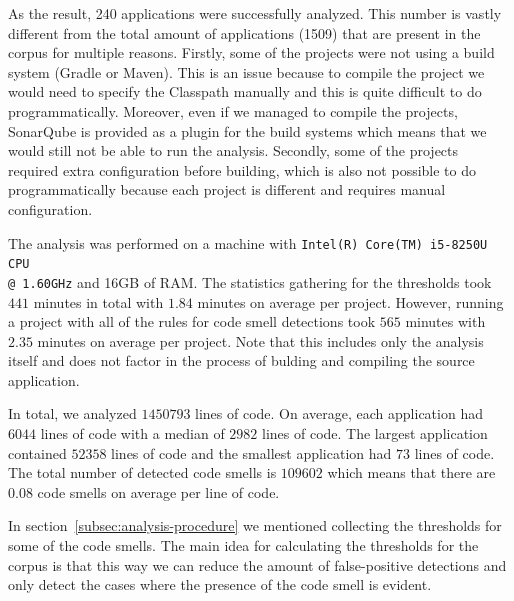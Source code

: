 

As the result, 240 applications were successfully analyzed.
This number is vastly different from the total amount of applications (1509) that are present in the corpus for multiple reasons.
Firstly, some of the projects were not using a build system (Gradle or Maven).
This is an issue because to compile the project we would need to specify the Classpath manually and
this is quite difficult to do programmatically.
Moreover, even if we managed to compile the projects, SonarQube is provided as a plugin for the build systems which means
that we would still not be able to run the analysis.
Secondly, some of the projects required extra configuration before building, which is also not possible to do
programmatically because each project is different and requires manual configuration.

The analysis was performed on a machine with \verb|Intel(R) Core(TM) i5-8250U CPU| \\ \verb|@ 1.60GHz| and 16GB of RAM\@.
The statistics gathering for the thresholds took $441$ minutes in total with $1.84$ minutes on average per project.
However, running a project with all of the rules for code smell detections took $565$ minutes with $2.35$ minutes on average per project.
Note that this includes only the analysis itself and does not factor in the process of bulding and compiling the source
application.

In total, we analyzed $1450793$ lines of code.
On average, each application had $6044$ lines of code with a median of $2982$ lines of code.
The largest application contained $52358$ lines of code and the smallest application had $73$ lines of code.
The total number of detected code smells is $109602$ which means that there are $0.08$ code smells on average per line of code.


In section~\ref{subsec:analysis-procedure} we mentioned collecting the thresholds for some of the code smells.
The main idea for calculating the thresholds for the corpus is that this way we can reduce
the amount of false-positive detections and only detect the cases where the presence of the code smell is evident.

